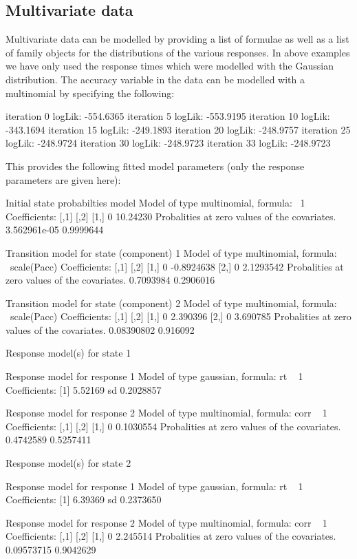 \documentclass[article]{jss}
\begin{document}
\subsection{Multivariate data}

Multivariate data can be modelled by providing a list of formulae as
well as a list of family objects for the distributions of the various
responses.  In above examples we have only used the response times
which were modelled with the Gaussian distribution.  The accuracy
variable in the  data can be modelled with a multinomial
by specifying the following:
\begin{Schunk}
\begin{Soutput}
iteration 0 logLik: -554.6365 
iteration 5 logLik: -553.9195 
iteration 10 logLik: -343.1694 
iteration 15 logLik: -249.1893 
iteration 20 logLik: -248.9757 
iteration 25 logLik: -248.9724 
iteration 30 logLik: -248.9723 
iteration 33 logLik: -248.9723 
\end{Soutput}
\end{Schunk}

This provides the following fitted model parameters (only the 
response parameters are given here): 
\begin{Schunk}
\begin{Soutput}
Initial state probabilties model 
Model of type multinomial, formula: ~1
Coefficients: 
     [,1]     [,2]
[1,]    0 10.24230
Probalities at zero values of the covariates.
3.562961e-05 0.9999644 

Transition model for state (component) 1 
Model of type multinomial, formula: ~scale(Pacc)
Coefficients: 
     [,1]       [,2]
[1,]    0 -0.8924638
[2,]    0  2.1293542
Probalities at zero values of the covariates.
0.7093984 0.2906016 

Transition model for state (component) 2 
Model of type multinomial, formula: ~scale(Pacc)
Coefficients: 
     [,1]     [,2]
[1,]    0 2.390396
[2,]    0 3.690785
Probalities at zero values of the covariates.
0.08390802 0.916092 


Response model(s) for state 1 

Response model for response 1 
Model of type gaussian, formula: rt ~ 1
Coefficients: 
[1] 5.52169
sd  0.2028857 

Response model for response 2 
Model of type multinomial, formula: corr ~ 1
Coefficients: 
     [,1]      [,2]
[1,]    0 0.1030554
Probalities at zero values of the covariates.
0.4742589 0.5257411 


Response model(s) for state 2 

Response model for response 1 
Model of type gaussian, formula: rt ~ 1
Coefficients: 
[1] 6.39369
sd  0.2373650 

Response model for response 2 
Model of type multinomial, formula: corr ~ 1
Coefficients: 
     [,1]     [,2]
[1,]    0 2.245514
Probalities at zero values of the covariates.
0.09573715 0.9042629 
\end{Soutput}
\end{Schunk}
\end{document}
